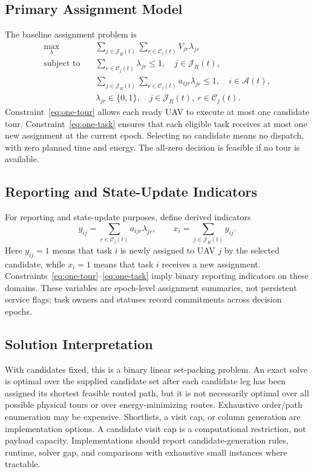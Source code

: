 \documentclass[conference]{IEEEtran}
\begin{document}
\subsection{Primary Assignment Model}
The baseline assignment problem is
\begin{align}
\max_{\lambda}\quad&
\sum_{j\in\mathcal J_R(t)}\sum_{r\in\mathcal C_j(t)}V_{jr}\lambda_{jr}
\label{eq:objective}\\
\text{subject to}\quad&
\sum_{r\in\mathcal C_j(t)}\lambda_{jr}\leq1,
\quad j\in\mathcal J_R(t),\label{eq:one-tour}\\
&\sum_{j\in\mathcal J_R(t)}\sum_{r\in\mathcal C_j(t)}a_{ijr}\lambda_{jr}\leq1,
\quad i\in\mathcal A(t),\label{eq:one-task}\\
&\lambda_{jr}\in\{0,1\},\quad
j\in\mathcal J_R(t),\ r\in\mathcal C_j(t).
\end{align}
Constraint~\eqref{eq:one-tour} allows each ready UAV to execute at most one candidate tour. Constraint~\eqref{eq:one-task} ensures that each eligible task receives at most one new assignment at the current epoch. Selecting no candidate means no dispatch, with zero planned time and energy. The all-zero decision is feasible if no tour is available.

\subsection{Reporting and State-Update Indicators}
For reporting and state-update purposes, define derived indicators
\begin{equation}
y_{ij}=\sum_{r\in\mathcal C_j(t)}a_{ijr}\lambda_{jr},\qquad
x_i=\sum_{j\in\mathcal J_R(t)}y_{ij}.
\end{equation}
Here $y_{ij}=1$ means that task $i$ is newly assigned to UAV $j$ by the selected candidate, while $x_i=1$ means that task $i$ receives a new assignment. Constraints~\eqref{eq:one-tour}--\eqref{eq:one-task} imply binary reporting indicators on these domains. These variables are epoch-level assignment summaries, not persistent service flags; task owners and statuses record commitments across decision epochs.

\subsection{Solution Interpretation}
With candidates fixed, this is a binary linear set-packing problem. An exact solve is optimal over the supplied candidate set after each candidate leg has been assigned its shortest feasible routed path, but it is not necessarily optimal over all possible physical tours or over energy-minimizing routes. Exhaustive order/path enumeration may be expensive. Shortlists, a visit cap, or column generation are implementation options. A candidate visit cap is a computational restriction, not payload capacity. Implementations should report candidate-generation rules, runtime, solver gap, and comparisons with exhaustive small instances where tractable.
\end{document}
